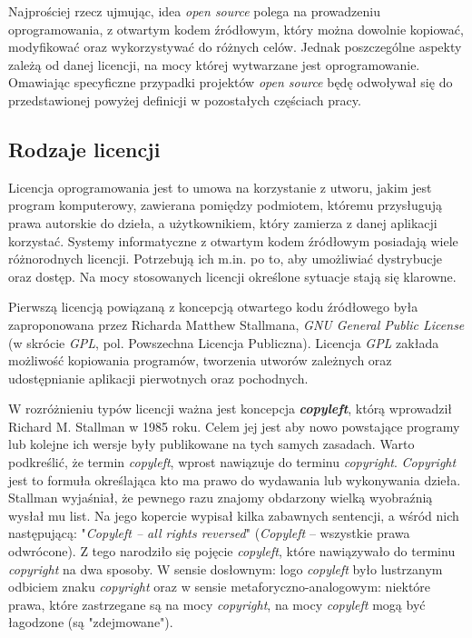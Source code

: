 \documentclass{article}
\begin{document}
Najprościej rzecz ujmując, idea \emph{open source} polega na prowadzeniu oprogramowania, z otwartym kodem źródłowym, który można dowolnie kopiować, modyfikować oraz wykorzystywać do różnych celów. Jednak poszczególne aspekty zależą od danej licencji, na mocy której wytwarzane jest oprogramowanie. Omawiając specyficzne przypadki projektów \emph{open source} będę odwoływał się do przedstawionej powyżej definicji w pozostałych częściach pracy.

\subsection{Rodzaje licencji}

\hspace{4mm} Licencja oprogramowania jest to umowa na korzystanie z utworu, jakim jest program komputerowy, zawierana pomiędzy podmiotem, któremu przysługują prawa autorskie do dzieła, a użytkownikiem, który zamierza z danej aplikacji korzystać\cite{wikipedia1}. Systemy informatyczne z otwartym kodem źródłowym posiadają wiele różnorodnych licencji. Potrzebują ich m.in. po to, aby umożliwiać dystrybucje oraz dostęp. Na mocy stosowanych licencji określone sytuacje stają się klarowne. 

Pierwszą licencją powiązaną z koncepcją otwartego kodu źródłowego była zaproponowana przez Richarda Matthew Stallmana, \emph{GNU General Public License} (w skrócie \emph{GPL}, pol. Powszechna Licencja Publiczna)\cite{Kotula}. Licencja \emph{GPL} zakłada możliwość kopiowania programów, tworzenia utworów zależnych oraz udostępnianie aplikacji pierwotnych oraz pochodnych\cite{wikipedia2}.

W rozróżnieniu typów licencji ważna jest koncepcja \textbf{\emph{copyleft}}, którą wprowadził Richard M. Stallman w 1985 roku. Celem jej jest aby nowo powstające programy lub kolejne ich wersje były publikowane na tych samych zasadach. Warto podkreślić, że termin \emph{copyleft}, wprost nawiązuje do terminu \emph{copyright}. \emph{Copyright} jest to formuła określająca kto ma prawo do wydawania lub wykonywania dzieła\cite{sjp}. Stallman wyjaśniał, że pewnego razu znajomy obdarzony wielką wyobraźnią wysłał mu list. Na jego kopercie wypisał kilka zabawnych sentencji, a wśród nich następującą: "\emph{Copyleft  – all rights reversed}" (\emph{Copyleft}  – wszystkie prawa odwrócone). Z tego narodziło się pojęcie \emph{copyleft}, które nawiązywało do terminu \emph{copyright} na dwa sposoby. W sensie dosłownym: logo \emph{copyleft} było lustrzanym odbiciem znaku \emph{copyright} oraz w sensie metaforyczno-analogowym: niektóre prawa, które zastrzegane są na mocy \emph{copyright}, na mocy \emph{copyleft} mogą być łagodzone (są "zdejmowane")\cite{Kotula}.
\end{document}

